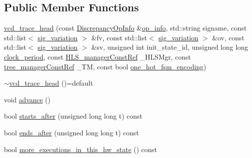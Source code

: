 \subsection*{Public Member Functions}
\begin{DoxyCompactItemize}
\item 
\hyperlink{structvcd__trace__head_a809cb4e23fba0c1b8f1ef9080356c6b9}{vcd\+\_\+trace\+\_\+head} (const \hyperlink{classDiscrepancyOpInfo}{Discrepancy\+Op\+Info} \&\hyperlink{structvcd__trace__head_ab9af239642c986de4ac370c4f1aac89d}{op\+\_\+info}, std\+::string signame, const std\+::list$<$ \hyperlink{structsig__variation}{sig\+\_\+variation} $>$ \&fv, const std\+::list$<$ \hyperlink{structsig__variation}{sig\+\_\+variation} $>$ \&ov, const std\+::list$<$ \hyperlink{structsig__variation}{sig\+\_\+variation} $>$ \&sv, unsigned int init\+\_\+state\+\_\+id, unsigned long long \hyperlink{structvcd__trace__head_aa2628fa99bf78726ad2bc68d2e26b8cc}{clock\+\_\+period}, const \hyperlink{hls__manager_8hpp_a1b481383e3beabc89bd7562ae672dd8c}{H\+L\+S\+\_\+manager\+Const\+Ref} \+\_\+\+H\+L\+S\+Mgr, const \hyperlink{tree__manager_8hpp_a792e3f1f892d7d997a8d8a4a12e39346}{tree\+\_\+manager\+Const\+Ref} \+\_\+\+TM, const bool \hyperlink{structvcd__trace__head_abf2f32f88367884a7424738693ec5fd8}{one\+\_\+hot\+\_\+fsm\+\_\+encoding})
\item 
\hyperlink{structvcd__trace__head_af56db488ec24f5abbc725385b4e8fe31}{$\sim$vcd\+\_\+trace\+\_\+head} ()=default
\item 
void \hyperlink{structvcd__trace__head_a20ce69cc689b656626dd0400b8606e95}{advance} ()
\item 
bool \hyperlink{structvcd__trace__head_a71368425927cf032fcbfa62d280f8a6e}{starts\+\_\+after} (unsigned long long t) const
\item 
bool \hyperlink{structvcd__trace__head_a08e6fa00d6e2d694a3297cd536558cb1}{ends\+\_\+after} (unsigned long long t) const
\item 
bool \hyperlink{structvcd__trace__head_afaca372a204f448329b859a6f1e19b6c}{more\+\_\+executions\+\_\+in\+\_\+this\+\_\+hw\+\_\+state} () const
\end{DoxyCompactItemize}
